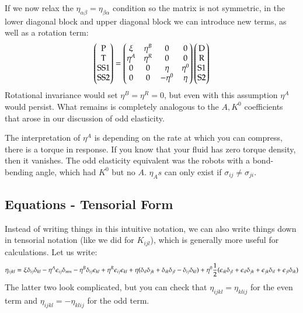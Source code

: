 If we now relax the $\eta_{\alpha\beta} = \eta_{\beta\alpha}$ condition so the matrix is not symmetric, in the lower diagonal block and upper diagonal block we can introduce new terms, as well as a rotation term:
\begin{equation}
    \begin{pmatrix}\text{P} \\ \text{T} \\ \text{SS1} \\ \text{SS2}\end{pmatrix} = \begin{pmatrix}\xi & \eta^B & 0 & 0 \\ \eta^A & \eta^R & 0 & 0 \\ 0 & 0 & \eta & \eta^0 \\ 0 & 0 & -\eta^0 & \eta\end{pmatrix}\begin{pmatrix}\text{D} \\ \text{R} \\ \text{S1} \\ \text{S2}\end{pmatrix}
\end{equation}
Rotational invariance would set $\eta^B = \eta^R = 0$, but even with this assumption $\eta^A$ would persist. What remains is completely analogous to the $A, K^0$ coefficients that arose in our discussion of odd elasticity.

The interpretation of $\eta^A$ is depending on the rate at which you can compress, there is a torque in response. If you know that your fluid has zero torque density, then it vanishes. The odd elasticity equivalent was the robots with a bond-bending angle, which had $K^0$ but no $A$. $\eta_As$ can only exist if $\sigma_{ij} \neq \sigma_{ji}$.

\subsection{Equations - Tensorial Form}
Instead of writing things in this intuitive notation, we can also write things down in tensorial notation (like we did for $K_{ijl}$), which is generally more useful for calculations. Let us write:
\begin{equation}
    \eta_{ijkl} = \xi \delta_{ij}\delta_{kl} - \eta^A \epsilon_{ij}\delta_{mn} - \eta^B \delta_{ij}\epsilon_{kl} + \eta^R \epsilon_{ij}\epsilon_{kl} + \eta(\delta_{il}\delta_{jk} + \delta_{ik}\delta_{jl} - \delta_{ij}\delta_{kl}) + \eta^0\frac{1}{2}(\epsilon_{ik}\delta_{jl} + \epsilon_{il}\delta_{jk} + \epsilon_{jk}\delta_{il} + \epsilon_{jl}\delta_{ik})
\end{equation}
The latter two look complicated, but you can check that $\eta_{ijkl} = \eta_{klij}$ for the even term and $\eta_{ijkl} = -\eta_{klij}$ for the odd term.

